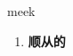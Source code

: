 
\begin{frame}
{\huge meek}
\begin{center}
\begin{enumerate}\Large
  \item \textbf{顺从的}
\end{enumerate}
\end{center}
\end{frame}
